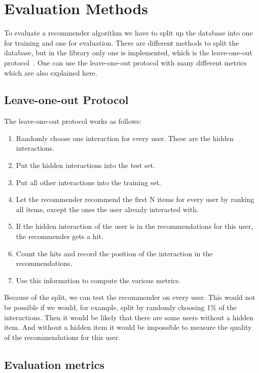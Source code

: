 \section{Evaluation Methods}

To evaluate a recommender algorithm we have to split up the database
into one for training and one for evaluation. There are different
methods to split the database, but in the library only one is implemented,
which is the leave-one-out protocol~\cite{leaveoneout}.
One can use the leave-one-out protocol with many different metrics
which are also explained here.


\subsection{Leave-one-out Protocol}
\label{leaveoneout}

The leave-one-out protocol works as follows:
\begin{enumerate}
\item Randomly choose one interaction for every user. These are the hidden
interactions.
\item Put the hidden interactions into the test set.
\item Put all other interactions into the training set.
\item Let the recommender recommend the first N items for every user by ranking
all items, except the ones the user already interacted with.
\item If the hidden interaction of the user is in the recommendations
for this user, the recommender gets a hit.
\item Count the hits and record the position of the interaction in the 
recommendations.
\item Use this information to compute the various metrics.

\end{enumerate}
Because of the split, we can test the recommender on every user.
This would not be possible
if we would, for example, split by randomly choosing 1\% of the interactions.
Then it would be likely that there are some users without a hidden item.
And without a hidden item it would be impossible to measure the quality
of the recommendations for this user.




\subsection{Evaluation metrics}
\label{evaluationmetrics}

